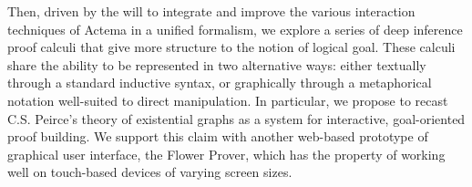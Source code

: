 Then, driven by the will to integrate and improve the various interaction
techniques of Actema in a unified formalism, we explore a series of deep
inference proof calculi that give more structure to the notion of logical goal.
These calculi share the ability to be represented in two alternative ways:
either textually through a standard inductive syntax, or graphically through a
metaphorical notation well-suited to direct manipulation. In particular, we
propose to recast C.S. Peirce's theory of existential graphs as a system for
interactive, goal-oriented proof building. We support this claim with another
web-based prototype of graphical user interface, the Flower Prover, which has
the property of working well on touch-based devices of varying screen sizes.


\begingroup %

\setlength{\textheight}{230\vscale} %

\etocstandarddisplaystyle %
\etocstandardlines %

\tableofcontents %

\listoffigures %

\let\cleardoublepage\bigskip
\let\clearpage\bigskip

\listoftables %

\endgroup


\mainmatter %

